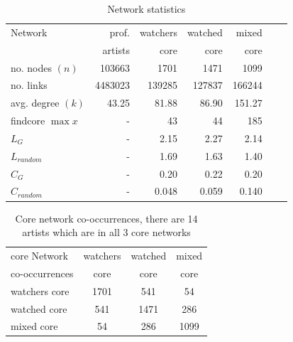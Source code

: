 \begin{table}[htb]
    \centering
    \begin{tabular}
        { | l | r | r | r | r | r | r |} 
        \hline
        Network &  prof.  & watchers & watched & mixed\\
	            &  artists & core & core & core \\
        \hline
	no. nodes $(n)$& 103663 & 1701 & 1471 & 1099 \\
	no. links & 4483023 & 139285 & 127837  & 166244 \\
	avg. degree $(k)$& 43.25 & 81.88 & 86.90 & 151.27 \\
	findcore $\max x$ & - & 43 & 44 & 185\\
	$L_G$ & - & 2.15 & 2.27 & 2.14 \\
	$L_{random}$ & - & 1.69 & 1.63 & 1.40 \\
	$C_G$ & - & 0.20 & 0.22 & 0.20 \\
	$C_{random}$ & - & 0.048 & 0.059 & 0.140 \\
	\hline
    \end{tabular}
    \caption{Network statistics}
    \label{tab:netstatistics}
\end{table}
\begin{table}[htb]
    \centering
    \begin{tabular}
        { | l | c | c | c |} 
        \hline
        core Network & watchers & watched & mixed\\
        co-occurrences  &   core & core & core \\
        \hline
        watchers core & 1701 &541& 54\\
        watched core & 541 &1471& 286\\
        mixed core  &54 &286 &1099\\
	\hline
    \end{tabular}
    \caption{Core network co-occurrences, there are 14 artists which are in all 3 core networks}
    \label{tab:netcooccurrences}
\end{table}

